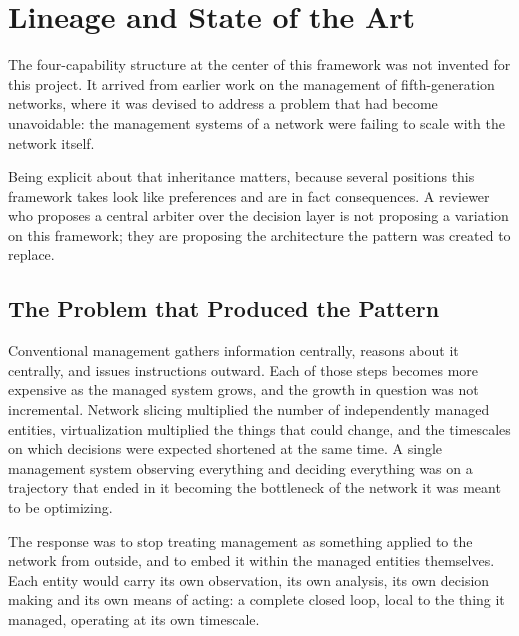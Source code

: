 
\hypertarget{lineage-and-state-of-the-art}{%
\section{Lineage and State of the Art}\label{lineage-and-state-of-the-art}}

The four-capability structure at the center of this framework was not
invented for this project. It arrived from earlier work on the
management of fifth-generation networks, where it was devised to address
a problem that had become unavoidable: the management systems of a
network were failing to scale with the network itself.

Being explicit about that inheritance matters, because several positions
this framework takes look like preferences and are in fact consequences.
A reviewer who proposes a central arbiter over the decision layer is not
proposing a variation on this framework; they are proposing the
architecture the pattern was created to replace.

\hypertarget{the-problem-that-produced-the-pattern}{%
\subsection{The Problem that Produced the Pattern}\label{the-problem-that-produced-the-pattern}}

Conventional management gathers information centrally, reasons about it
centrally, and issues instructions outward. Each of those steps becomes
more expensive as the managed system grows, and the growth in question
was not incremental. Network slicing multiplied the number of
independently managed entities, virtualization multiplied the things
that could change, and the timescales on which decisions were expected
shortened at the same time. A single management system observing
everything and deciding everything was on a trajectory that ended in it
becoming the bottleneck of the network it was meant to be optimizing.

The response was to stop treating management as something applied to the
network from outside, and to embed it within the managed entities
themselves. Each entity would carry its own observation, its own
analysis, its own decision making and its own means of acting: a
complete closed loop, local to the thing it managed, operating at its
own timescale.

